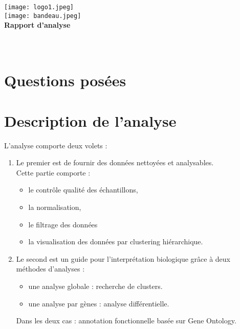 \documentclass[a4paper]{article}
\title{}
\author{}
\begin{document}
\makeatletter
  \begin{titlepage}
	    \centering
			\hfill
			  \texttt{[image: logo1.jpeg]}\\
			  \vspace{3em}
			   \texttt{[image: bandeau.jpeg]}\\
			  \vspace{1cm}
			    {\large\textbf{Rapport d'analyse}}\\
			  \vspace{1em}
			 {\LARGE \textbf{\@title}} \\
			     \vspace{2em}
			{\large \@author} 
			   \vfill
			   {\large\textbf{	\@date}}\\
	\end{titlepage}
\makeatother
\tableofcontents
\newpage
\pagestyle{fancy}
\section{Questions posées}

\section{Description de l'analyse}
L'analyse comporte deux volets :
\begin{enumerate}
	\item Le premier est de fournir des données nettoyées et analysables. 
	\\ Cette partie comporte : 
	\begin{itemize}
		\item le contrôle qualité des échantillons, 
		\item la normalisation, 
		\item le filtrage des données 
		\item la visualisation des données par clustering hiérarchique. 
	\end{itemize}
	\item Le second est un guide pour l'interprétation biologique grâce à deux méthodes d'analyses :
	\begin{itemize}
		\item une analyse globale : recherche de clusters. 
		\item une analyse par gènes : analyse différentielle.
	\end{itemize}
		Dans les deux cas : annotation fonctionnelle basée sur Gene Ontology.
\end{enumerate}
\end{document}
